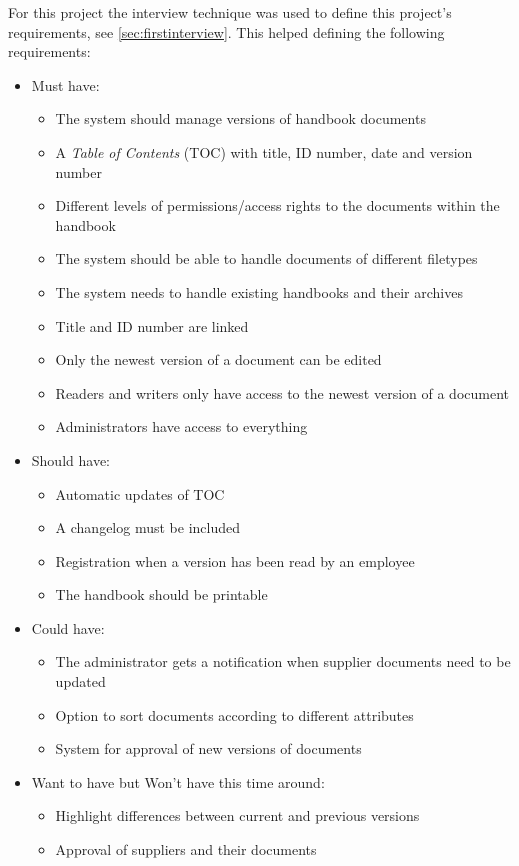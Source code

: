 For this project the interview technique was used to define this project's requirements, see \cref{sec:firstinterview}. This helped defining the following requirements:

\begin{itemize}
        \item Must have:
        \begin{itemize}
                \item The system should manage versions of handbook documents
                \item A \textit{Table of Contents} (TOC) with title, ID number, date and version number
                \item Different levels of permissions/access rights to the documents within the handbook
                \item The system should be able to handle documents of different filetypes
                \item The system needs to handle existing handbooks and their archives
                \item Title and ID number are linked
                \item Only the newest version of a document can be edited
                \item Readers and writers only have access to the newest version of a document
                \item Administrators have access to everything
        \end{itemize}
        \item Should have:
        \begin{itemize}
                \item Automatic updates of TOC
                \item A changelog must be included
                \item Registration when a version has been read by an employee
                \item The handbook should be printable
        \end{itemize}
        \item Could have:
        \begin{itemize}
                \item The administrator gets a notification when supplier documents need to be updated
                \item Option to sort documents according to different attributes
                \item System for approval of new versions of documents
        \end{itemize}
        \item Want to have but Won't have this time around:
        \begin{itemize}
                \item Highlight differences between current and previous versions
                \item Approval of suppliers and their documents
        \end{itemize}
\end{itemize}
